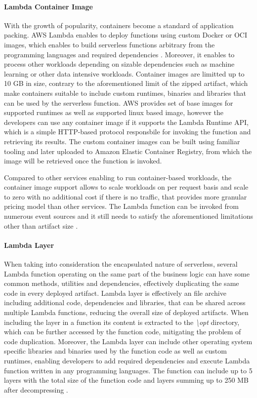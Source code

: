 \paragraph{Lambda Container Image} 

With the growth of popularity, containers become a standard of application packing. AWS Lambda enables to deploy functions using custom Docker or OCI images, which enables to build serverless functions arbitrary from the programming languages and required dependencies \cite{AWSLambdaContainerImage}. Moreover, it enables to process other workloads depending on sizable dependencies such as machine learning or other data intensive workloads.
Container images are limitted up to 10 GB in size, contrary to the aforementioned limit of the zipped artifact, which make containers suitable to include custom runtimes, binaries and libraries that can be used by the serverless function. 
AWS provides set of base images for supported runtimes as well as supported linux based image, however the developers can use any container image if it supports the Lambda Runtime API, which is a simple HTTP-based protocol responsbile for invoking the function and retrieving its results. 
The custom container images can be built using familiar tooling and later uploaded to Amazon Elastic Container Registry, from which the image will be retrieved once the function is invoked.

Compared to other services enabling to run container-based workloads, the container image support allows to scale workloads on per request basis and scale to zero with no additional cost if there is no traffic, that provides more granular pricing model than other services. The Lambda function can be invoked from numerous event sources and it still needs to satisfy the aforementioned limitations other than artifact size \cite{RunningContainerImagesInAWSLambda}.

\paragraph{Lambda Layer}

When taking into consideration the encapsulated nature of serverless, several Lambda function operating on the same part of the business logic can have some common methods, utilities and dependencies, effectively duplicating the same code in every deployed artifact. 
Lambda layer is effectively an file archive including additional code, dependencies and libraries, that can be shared across multiple Lambda functions, reducing the overall size of deployed artifacts. 
When including the layer in a function its content is extracted to the \textit{\textbackslash opt} directory, which can be further accessed by the function code, mitigating the problem of code duplication.
Moreover, the Lambda layer can include other operating system specific libraries and binaries used by the function code as well as custom runtimes, enabling developers to add required dependencies and execute Lambda function written in any programming languages.
The function can include up to 5 layers with the total size of the function code and layers summing up to 250 MB after decompressing \cite{AWSLambdaLayer}.

